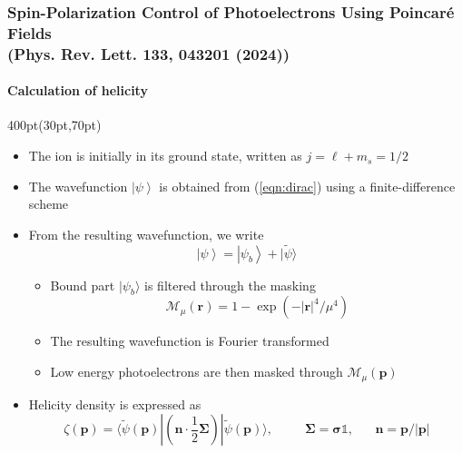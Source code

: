 \begin{frame}
\frametitle{Spin-Polarization Control of Photoelectrons
Using Poincar\'e Fields \\
\small (Phys. Rev. Lett. \textbf{133}, 043201 (2024))}
\framesubtitle{Calculation of helicity}


\footnotesize
\begin{textblock*}{400pt}(30pt,70pt)
\begin{itemize}
\item The ion is initially in its ground state, written as $j=\ell + m_s=1/2$
\item The wavefunction $\left|\psi\right\rangle$ is 
obtained from (\ref{eqn:dirac})
using a finite-difference scheme
\item From the resulting wavefunction, we write
\begin{equation}
\left| \psi\right\rangle = 
\left|\psi_b\right\rangle + 
|\widetilde{\psi}\rangle
\end{equation}
\begin{itemize}
\footnotesize
\item[$\bullet$] Bound part $|\psi_b\rangle$ is filtered through the masking 
\begin{equation}
\mathcal{M}_\mu(\boldsymbol{r}) = 1-\exp\left(-|\boldsymbol{r}|^4/\mu^4\right)
\end{equation}
\item[$\bullet$] The resulting wavefunction is Fourier transformed
\item[$\bullet$] Low energy photoelectrons are then masked through
$\mathcal{M}_\mu(\boldsymbol{p})$
\end{itemize}
\item Helicity density is expressed as
\begin{equation}
\zeta(\boldsymbol{p}) = \langle \widetilde{\psi}(\boldsymbol{p}) |
\left( \boldsymbol{n}\cdot\frac{1}{2}\boldsymbol{\Sigma}\right)
|\widetilde{\psi}(\boldsymbol{p})\rangle, \hspace{30pt}
\boldsymbol{\Sigma}=\boldsymbol{\sigma}\mathds{1}, \hspace{20pt}
\boldsymbol{n} = \boldsymbol{p}/|\boldsymbol{p}|
\end{equation}
\end{itemize}
\end{textblock*}



\end{frame}












